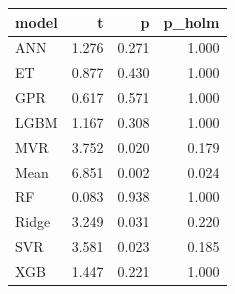 \begin{tabular}{lrrr}
\toprule
model & t & p & p\_holm \\
\midrule
ANN & 1.276 & 0.271 & 1.000 \\
ET & 0.877 & 0.430 & 1.000 \\
GPR & 0.617 & 0.571 & 1.000 \\
LGBM & 1.167 & 0.308 & 1.000 \\
MVR & 3.752 & 0.020 & 0.179 \\
Mean & 6.851 & 0.002 & 0.024 \\
RF & 0.083 & 0.938 & 1.000 \\
Ridge & 3.249 & 0.031 & 0.220 \\
SVR & 3.581 & 0.023 & 0.185 \\
XGB & 1.447 & 0.221 & 1.000 \\
\bottomrule
\end{tabular}
